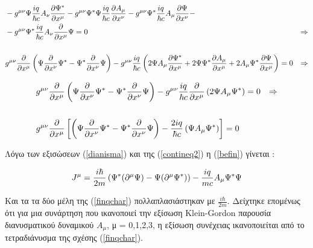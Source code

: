 \begin{align*}
 \\&-g^{\mu\nu}\Psi \frac{iq}{\hbar c} A_\nu \frac{\partial \Psi^*}{\partial x^\mu} -g^{\mu\nu} \Psi^*  \Psi\frac{iq}{\hbar c}\frac{\partial A_\mu}{\partial x^\nu}-g^{\mu\nu} \Psi^* \frac{iq}{\hbar c}A_\mu\frac{\partial \Psi}{\partial x^\nu}- 
  \\&-g^{\mu\nu}  \Psi^*  \frac{iq}{\hbar c} A_\nu \frac{\partial }{\partial x^\mu} \Psi =0  &\Rightarrow
  \\
  \\ &g^{\mu\nu} \frac{\partial }{\partial x^\mu} \left(    \Psi\frac{\partial }{\partial x^\nu}\Psi^*  - \Psi^* \frac{\partial }{\partial x^\nu} \Psi \right)  - g^{\mu\nu} \frac{iq}{\hbar c} \left(  2\Psi A_\mu\frac{\partial \Psi^*}{\partial x^\mu} +2\Psi \Psi^* \frac{\partial A_\mu}{\partial x^\mu}+ 2 A_\mu \Psi^* \frac{\partial \Psi}{\partial x^\mu} \right) =0 &\Rightarrow
\end{align*}

\begin{align}
  \notag &g^{\mu\nu} \frac{\partial }{\partial x^\mu} \left(    \Psi\frac{\partial }{\partial x^\nu}\Psi^*  - \Psi^* \frac{\partial }{\partial x^\nu} \Psi \right)  - g^{\mu\nu} \frac{iq}{\hbar c} \frac{\partial }{\partial x^\mu}\left(  2\Psi A_\mu \Psi^* \right) =0 &\Rightarrow
  \notag\\
  \\& g^{\mu\nu} \frac{\partial }{\partial x^\mu} \left[   \left(  \Psi\frac{\partial }{\partial x^\nu}\Psi^*  - \Psi^* \frac{\partial }{\partial x^\nu} \Psi \right)  - \frac{2iq}{\hbar c} \left(  \Psi A_\mu \Psi^* \right)  \right]  = 0
  \label{befin}
\end{align}
\vspace{0.5cm}

Λόγω των εξισώσεων (\ref{dianisma}) και της (\ref{contineq2}) η (\ref{befin}) γίνεται : 
\vspace{0.5cm}
\begin{mdframed}
  \begin{equation}
    J^\mu =\frac{i \hbar}{2m} \left(  \Psi^* (\partial ^\mu \Psi)-\Psi(\partial ^\mu \Psi^*) \right)  - \frac{iq}{mc} A_\mu \Psi^* \Psi 
    \label{finqchar}
  \end{equation}
\end{mdframed}
\vspace{0.5cm}
Kαι τα τα δύο μέλη της (\ref{finqchar}) πολλαπλασιάστηκαν με $\frac{i \hbar}{2m}$. Δείχτηκε επομένως ότι για μια συνάρτηση που ικανοποιεί την εξίσωση \textlatin{Klein-Gordon} παρουσία διανυσματικού δυναμικού $A_\mu$, μ = 0,1,2,3, η εξίσωση συνέχειας ικανοποιείται από το τετραδιάνυσμα της σχέσης (\ref{finqchar}). 


